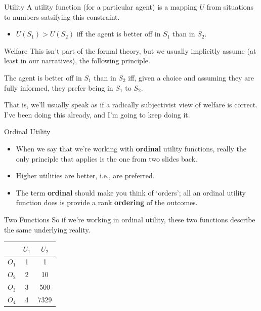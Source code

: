 \documentclass[
  14pt,
  letterpaper,
  ignorenonframetext,
  aspectratio=169,
]{beamer}
\providecommand{\tightlist}{%
  \setlength{\itemsep}{0pt}\setlength{\parskip}{0pt}}\usepackage{longtable,booktabs,array}
\renewenvironment*{quote}	
	{\list{}{\rightmargin   \leftmargin} \item } 	
	{\endlist }
\let\olditem\item
\renewcommand{\item}{%
\olditem\vspace{6pt}}
\begin{document}
\begin{frame}{Utility}
\protect\hypertarget{utility-2}{}
A utility function (for a particular agent) is a mapping \(U\) from
situations to numbers satsifying this constraint.

\begin{itemize}[<+->]
\tightlist
\item
  \(U(S_1) > U(S_2)\) iff the agent is better off in \(S_1\) than in
  \(S_2\).
\end{itemize}
\end{frame}

\begin{frame}{Welfare}
\protect\hypertarget{welfare}{}
This isn't part of the formal theory, but we usually implicitly assume
(at least in our narratives), the following principle.

\begin{quote}
The agent is better off in \(S_1\) than in \(S_2\) iff, given a choice
and assuming they are fully informed, they prefer being in \(S_1\) to
\(S_2\).
\end{quote}

That is, we'll usually speak as if a radically subjectivist view of
welfare is correct. I've been doing this already, and I'm going to keep
doing it.
\end{frame}

\begin{frame}{Ordinal Utility}
\protect\hypertarget{ordinal-utility}{}
\begin{itemize}[<+->]
\tightlist
\item
  When we say that we're working with \textbf{ordinal} utility
  functions, really the only principle that applies is the one from two
  slides back.
\item
  Higher utilities are better, i.e., are preferred.
\item
  The term \textbf{ordinal} should make you think of `orders'; all an
  ordinal utility function does is provide a rank \textbf{ordering} of
  the outcomes.
\end{itemize}
\end{frame}

\begin{frame}{Two Functions}
\protect\hypertarget{two-functions}{}
So if we're working in ordinal utility, these two functions describe the
same underlying reality.

\begin{longtable}[]{@{}lcc@{}}
\toprule()
& \(U_1\) & \(U_2\) \\
\midrule()
\endhead
\(O_1\) & 1 & 1 \\
\(O_2\) & 2 & 10 \\
\(O_3\) & 3 & 500 \\
\(O_4\) & 4 & 7329 \\
\bottomrule()
\end{longtable}
\end{frame}
\end{document}
